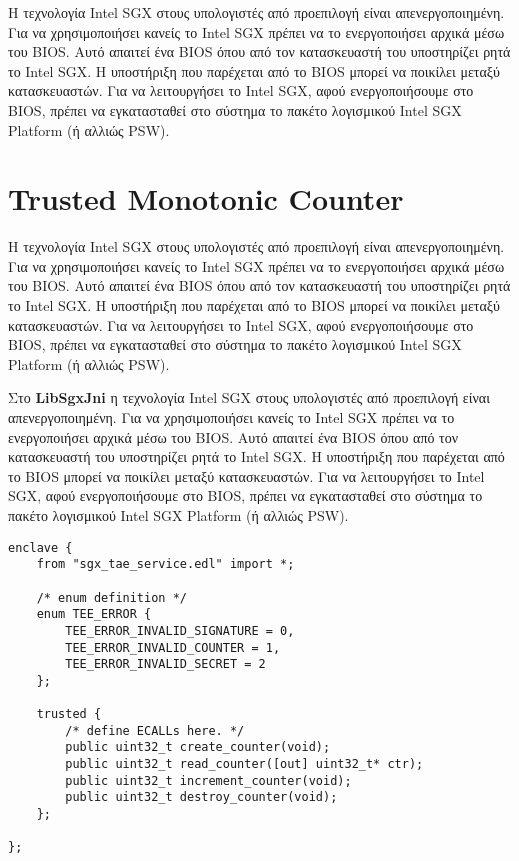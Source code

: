 Η τεχνολογία Intel SGX στους υπολογιστές από προεπιλογή είναι απενεργοποιημένη. Για να χρησιμοποιήσει κανείς το Intel SGX πρέπει να το ενεργοποιήσει αρχικά μέσω του BIOS. Αυτό απαιτεί ένα BIOS όπου από τον κατασκευαστή του υποστηρίζει ρητά το Intel SGX. Η υποστήριξη που παρέχεται από το BIOS μπορεί να ποικίλει μεταξύ κατασκευαστών. Για να λειτουργήσει το Intel SGX, αφού ενεργοποιήσουμε στο BIOS, πρέπει να εγκατασταθεί στο σύστημα το πακέτο λογισμικού Intel SGX Platform (ή αλλιώς PSW)\cite{linuxsgx}. 

\section{Trusted Monotonic Counter} \label{monotonicCounterimpl}
Η τεχνολογία Intel SGX στους υπολογιστές από προεπιλογή είναι απενεργοποιημένη. Για να χρησιμοποιήσει κανείς το Intel SGX πρέπει να το ενεργοποιήσει αρχικά μέσω του BIOS. Αυτό απαιτεί ένα BIOS όπου από τον κατασκευαστή του υποστηρίζει ρητά το Intel SGX. Η υποστήριξη που παρέχεται από το BIOS μπορεί να ποικίλει μεταξύ κατασκευαστών. Για να λειτουργήσει το Intel SGX, αφού ενεργοποιήσουμε στο BIOS, πρέπει να εγκατασταθεί στο σύστημα το πακέτο λογισμικού Intel SGX Platform (ή αλλιώς PSW)\cite{linuxsgx}. 

Στο \textbf{LibSgxJni} η τεχνολογία Intel SGX στους υπολογιστές από προεπιλογή είναι απενεργοποιημένη. Για να χρησιμοποιήσει κανείς το Intel SGX πρέπει να το ενεργοποιήσει αρχικά μέσω του BIOS. Αυτό απαιτεί ένα BIOS όπου από τον κατασκευαστή του υποστηρίζει ρητά το Intel SGX. Η υποστήριξη που παρέχεται από το BIOS μπορεί να ποικίλει μεταξύ κατασκευαστών. Για να λειτουργήσει το Intel SGX, αφού ενεργοποιήσουμε στο BIOS, πρέπει να εγκατασταθεί στο σύστημα το πακέτο λογισμικού Intel SGX Platform (ή αλλιώς PSW)\cite{linuxsgx}. 


\vspace{0.8cm}

\begin{minipage}{\linewidth}
\begin{lstlisting}[caption={$Enclave.edl$, η διεπαφή μεταξύ του enclave και του αναξιόπιστου κώδικα },captionpos=b,frame=single,label={lst:enclave}]  
enclave {
    from "sgx_tae_service.edl" import *;

    /* enum definition */
    enum TEE_ERROR {
        TEE_ERROR_INVALID_SIGNATURE = 0,
        TEE_ERROR_INVALID_COUNTER = 1,
        TEE_ERROR_INVALID_SECRET = 2
    };
        
    trusted {
        /* define ECALLs here. */
        public uint32_t create_counter(void);
        public uint32_t read_counter([out] uint32_t* ctr);
        public uint32_t increment_counter(void);
        public uint32_t destroy_counter(void);
    };

};
\end{lstlisting}
\end{minipage}

